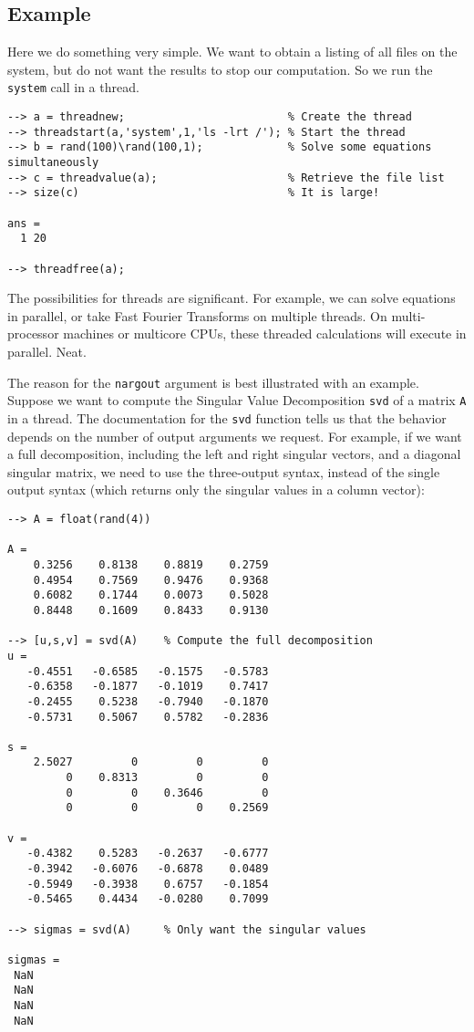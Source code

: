 \subsection{Example}

Here we do something very simple.  We want to obtain a listing of
all files on the system, but do not want the results to stop our
computation.  So we run the \verb|system| call in a thread.
\begin{verbatim}
--> a = threadnew;                         % Create the thread
--> threadstart(a,'system',1,'ls -lrt /'); % Start the thread
--> b = rand(100)\rand(100,1);             % Solve some equations simultaneously
--> c = threadvalue(a);                    % Retrieve the file list
--> size(c)                                % It is large!

ans = 
  1 20 

--> threadfree(a);
\end{verbatim}
The possibilities for threads are significant.  For example,
we can solve equations in parallel, or take Fast Fourier Transforms
on multiple threads.  On multi-processor machines or multicore CPUs,
these threaded calculations will execute in parallel.  Neat.

The reason for the  \verb|nargout| argument is best illustrated with
an example.  Suppose we want to compute the Singular Value 
Decomposition \verb|svd| of a matrix \verb|A| in a thread.  
The documentation for the \verb|svd| function tells us that
the behavior depends on the number of output arguments we request.
For example, if we want a full decomposition, including the left 
and right singular vectors, and a diagonal singular matrix, we
need to use the three-output syntax, instead of the single output
syntax (which returns only the singular values in a column vector):
\begin{verbatim}
--> A = float(rand(4))

A = 
    0.3256    0.8138    0.8819    0.2759 
    0.4954    0.7569    0.9476    0.9368 
    0.6082    0.1744    0.0073    0.5028 
    0.8448    0.1609    0.8433    0.9130 

--> [u,s,v] = svd(A)    % Compute the full decomposition
u = 
   -0.4551   -0.6585   -0.1575   -0.5783 
   -0.6358   -0.1877   -0.1019    0.7417 
   -0.2455    0.5238   -0.7940   -0.1870 
   -0.5731    0.5067    0.5782   -0.2836 

s = 
    2.5027         0         0         0 
         0    0.8313         0         0 
         0         0    0.3646         0 
         0         0         0    0.2569 

v = 
   -0.4382    0.5283   -0.2637   -0.6777 
   -0.3942   -0.6076   -0.6878    0.0489 
   -0.5949   -0.3938    0.6757   -0.1854 
   -0.5465    0.4434   -0.0280    0.7099 

--> sigmas = svd(A)     % Only want the singular values

sigmas = 
 NaN 
 NaN 
 NaN 
 NaN 
\end{verbatim}

